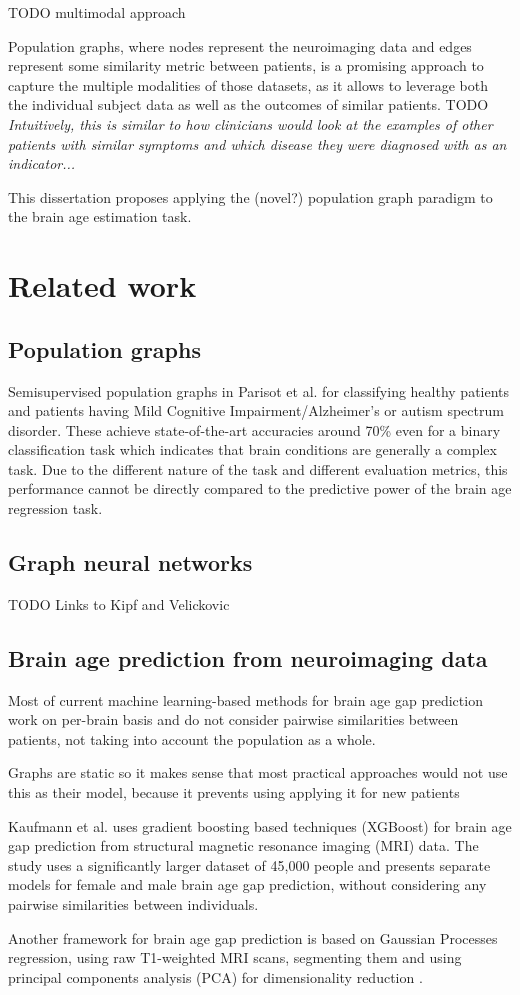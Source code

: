 TODO multimodal approach

Population graphs, where nodes represent the neuroimaging data and edges represent some similarity metric between patients, is a promising approach to capture the multiple modalities of those datasets, as it allows to leverage both the individual subject data as well as the outcomes of similar patients. 
TODO \textit{Intuitively, this is similar to how clinicians would look at the examples of other patients with similar symptoms and which disease they were diagnosed with as an indicator...}

This dissertation proposes applying the (novel?) population graph paradigm to the brain age estimation task.

\section{Related work}
\subsection{Population graphs}
Semisupervised population graphs in Parisot et al. for classifying healthy patients and patients having Mild Cognitive Impairment/Alzheimer's or autism spectrum disorder. These achieve state-of-the-art accuracies around 70\% even for a binary classification task which indicates that brain conditions are generally a complex task. Due to the different nature of the task and different evaluation metrics, this performance cannot be directly compared to the predictive power of the brain age regression task.

\subsection{Graph neural networks}
TODO Links to Kipf and Velickovic

\subsection{Brain age prediction from neuroimaging data}
Most of current machine learning-based methods for brain age gap prediction work on per-brain basis and do not consider pairwise similarities between patients, not taking into account the population as a whole.

Graphs are static so it makes sense that most practical approaches would not use this as their model, because it prevents using applying it for new patients

Kaufmann et al. \cite{kaufmann2019} uses gradient boosting based techniques (XGBoost) \cite{chen2016xgboost} for brain age gap prediction from structural magnetic resonance imaging (MRI) data. The study uses a significantly larger dataset of 45,000 people and presents separate models for female and male brain age gap prediction, without considering any pairwise similarities between individuals.

Another framework for brain age gap prediction is based on Gaussian Processes regression, using raw T1-weighted MRI scans, segmenting them and using principal components analysis (PCA) for dimensionality reduction \cite{cole2018brain}.
